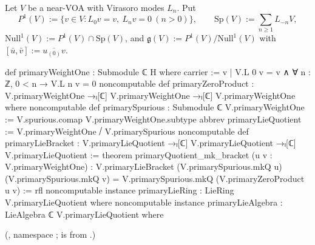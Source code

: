 \begin{definition}\label{ch18:def:primary}
Let $V$ be a near-VOA with Virasoro modes $L_n$.  Put
\begin{equation*}
  P^1(V):=\{v\in V: L_0v=v,\ L_nv=0\ (n>0)\},\qquad \mathrm{Sp}(V):=\sum_{n\ge1}L_{-n}V,
\end{equation*}
$\mathrm{Null}^1(V):=P^1(V)\cap\mathrm{Sp}(V)$, and $\mathfrak g(V):=P^1(V)/\mathrm{Null}^1(V)$ with $[\bar u,\bar v]:=\overline{u_{(0)}v}$.
\end{definition}
\begin{leancode}
def primaryWeightOne : Submodule ℂ H where
  carrier := {v | V.L 0 v = v ∧ ∀ n : ℤ, 0 < n → V.L n v = 0}
noncomputable def primaryZeroProduct :
    V.primaryWeightOne →ₗ[ℂ] V.primaryWeightOne →ₗ[ℂ] V.primaryWeightOne where
noncomputable def primarySpurious : Submodule ℂ V.primaryWeightOne :=
  V.spurious.comap V.primaryWeightOne.subtype
abbrev primaryLieQuotient := V.primaryWeightOne ⧸ V.primarySpurious
noncomputable def primaryLieBracket :
    V.primaryLieQuotient →ₗ[ℂ] V.primaryLieQuotient →ₗ[ℂ] V.primaryLieQuotient :=
theorem primaryQuotient_mk_bracket (u v : V.primaryWeightOne) :
    V.primaryLieBracket (V.primarySpurious.mkQ u) (V.primarySpurious.mkQ v) =
      V.primarySpurious.mkQ (V.primaryZeroProduct u v) := rfl
noncomputable instance primaryLieRing : LieRing V.primaryLieQuotient where
noncomputable instance primaryLieAlgebra : LieAlgebra ℂ V.primaryLieQuotient where
\end{leancode}
(, namespace ;  is
 from
.)

